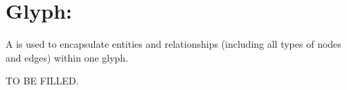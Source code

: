\color{red}
\section{Glyph: }
\label{sec:submap}

A  is used to encapsulate entities and relationships (including all types of nodes and edges) within one glyph.  

TO BE FILLED.


\normalcolor


